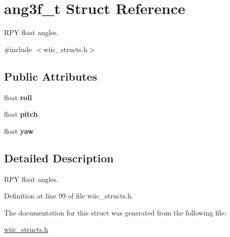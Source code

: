 \hypertarget{structang3f__t}{\section{ang3f\-\_\-t Struct Reference}
\label{structang3f__t}
}


R\-P\-Y float angles.  




{\ttfamily \#include $<$wiic\-\_\-structs.\-h$>$}

\subsection*{Public Attributes}
\begin{DoxyCompactItemize}
\item 
\hypertarget{structang3f__t_ae20d5612a396169a552d5cf1331ff44e}{float {\bfseries roll}}\label{structang3f__t_ae20d5612a396169a552d5cf1331ff44e}

\item 
\hypertarget{structang3f__t_a6b502912c6e6310980794a6659d1bb60}{float {\bfseries pitch}}\label{structang3f__t_a6b502912c6e6310980794a6659d1bb60}

\item 
\hypertarget{structang3f__t_a4aaa40b1ad6ca3477e92a40eab30f18f}{float {\bfseries yaw}}\label{structang3f__t_a4aaa40b1ad6ca3477e92a40eab30f18f}

\end{DoxyCompactItemize}


\subsection{Detailed Description}
R\-P\-Y float angles. 

Definition at line 99 of file wiic\-\_\-structs.\-h.



The documentation for this struct was generated from the following file\-:\begin{DoxyCompactItemize}
\item 
\hyperlink{wiic__structs_8h}{wiic\-\_\-structs.\-h}\end{DoxyCompactItemize}
